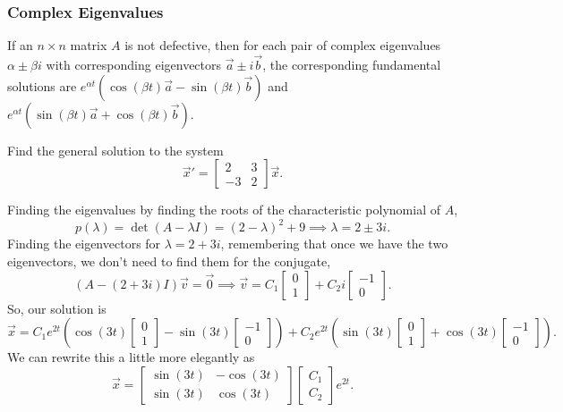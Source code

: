 \subsubsection{Complex Eigenvalues}
\begin{theorem}
	If an $n \times n$ matrix $A$ is not defective, then for each pair of complex eigenvalues $\alpha \pm \beta i$ with corresponding eigenvectors $\vec{a} \pm i\vec{b}$, the corresponding fundamental solutions are $e^{\alpha t}\left(\cos{(\beta t)}\vec{a}-\sin{(\beta t)\vec{b}}\right)$ and $e^{\alpha t}\left(\sin{(\beta t)}\vec{a}+\cos{(\beta t)\vec{b}}\right)$.
\end{theorem}

\begin{example}
	Find the general solution to the system
	\begin{equation*}
		\vec{x}' = \begin{bmatrix}
			2 & 3 \\
			-3 & 2
		\end{bmatrix} \vec{x}.
	\end{equation*}
\end{example}
\noindent
Finding the eigenvalues by finding the roots of the characteristic polynomial of $A$,
\begin{equation*}
	p(\lambda) = \det{(A - \lambda I)} = (2-\lambda)^2 + 9 \implies \lambda = 2 \pm 3i.
\end{equation*}
Finding the eigenvectors for $\lambda = 2 + 3i$, remembering that once we have the two eigenvectors, we don't need to find them for the conjugate,
\begin{equation*}
	(A - (2+3i)I)\vec{v} = \vec{0} \implies \vec{v} = C_1\begin{bmatrix}
		0 \\
		1
	\end{bmatrix} + C_2i\begin{bmatrix}
		-1 \\
		0
	\end{bmatrix}.
\end{equation*}
So, our solution is
\begin{equation*}
	\vec{x} = C_1e^{2t}\left(\cos{(3t)}\begin{bmatrix}
		0 \\
		1
	\end{bmatrix}-\sin{(3t)}\begin{bmatrix}
		-1 \\
		0
	\end{bmatrix}\right) + C_2e^{2t}\left(\sin{(3t)}\begin{bmatrix}
		0 \\
		1
	\end{bmatrix}+\cos{(3t)}\begin{bmatrix}
		-1 \\
		0
	\end{bmatrix}\right).
\end{equation*}
We can rewrite this a little more elegantly as
\begin{equation*}
	\vec{x} = \begin{bmatrix}
		\sin{(3t)} & - \cos{(3t)} \\
		\sin{(3t)} & \cos{(3t)}
	\end{bmatrix} \begin{bmatrix}
		C_1 \\
		C_2
	\end{bmatrix} e^{2t}.
\end{equation*}